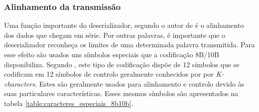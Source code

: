 \subsubsection*{Alinhamento da transmissão} \label{subsub:alinhamento}
Uma função importante do deserializador, segundo o autor de \cite{R032} é o alinhamento dos dados que chegam em série. Por outras palavras, é importante que o deserializador reconheça os limites de uma determinada palavra transmitida. Para esse efeito são usados uns símbolos especiais que a codificação 8B/10B disponibiliza. Segundo \cite{R032}, este tipo de codificação dispõe de 12 símbolos que se codificam em 12 símbolos de controlo geralmente conhecidos por por \textit{K-characters}. Estes são geralmente usados para alinhamento e controlo devido às suas particulares características. Esses mesmos símbolos são apresentados na tabela \ref{table:caracteres_especiais_8b10b}.


